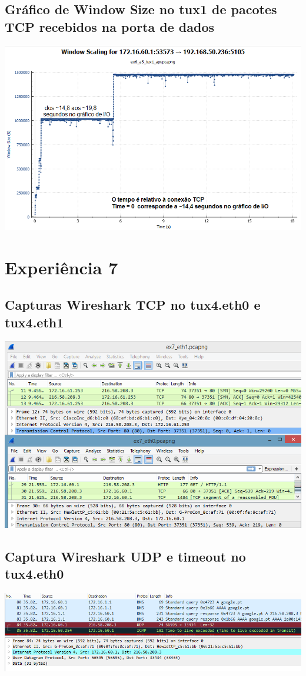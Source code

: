 \documentclass[11pt,a4paper,reqno]{report}
\numberwithin{equation}{section}
\begin{document}
\begin{appendices}
\subsection{Gráfico de Window Size no tux1 de pacotes TCP recebidos na porta de dados}
\label{ex6_window}
\includegraphics[width=16cm]{ex6_tux1_window.png}

\section{Experiência 7}%

\subsection{Capturas Wireshark TCP no tux4.eth0 e tux4.eth1}
\label{ex7_tcp}
\includegraphics[width=16cm]{ex7_TCP.png}
\subsection{Captura Wireshark UDP e timeout no tux4.eth0}
\label{ex7_udp}
\includegraphics[width=16cm]{ex7_udp_timeout.png}

\end{appendices}
\end{document}
